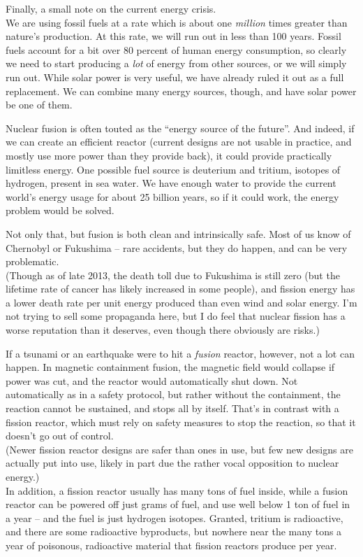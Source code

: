 Finally, a small note on the current energy crisis.\\
We are using fossil fuels at a rate which is about one \emph{million} times greater than nature's production. At this rate, we will run out in less than 100 years. Fossil fuels account for a bit over 80 percent of human energy consumption, so clearly we need to start producing a \emph{lot} of energy from other sources, or we will simply run out. While solar power is very useful, we have already ruled it out as a full replacement. We can combine many energy sources, though, and have solar power be one of them.

Nuclear fusion is often touted as the ``energy source of the future''. And indeed, if we can create an efficient reactor (current designs are not usable in practice, and mostly use more power than they provide back), it could provide practically limitless energy. One possible fuel source is deuterium and tritium, isotopes of hydrogen, present in sea water. We have enough water to provide the current world's energy usage for about 25 billion years, so if it could work, the energy problem would be solved.

Not only that, but fusion is both clean and intrinsically safe. Most of us know of Chernobyl or Fukushima -- rare accidents, but they do happen, and can be very problematic.\\
(Though as of late 2013, the death toll due to Fukushima is still zero (but the lifetime rate of cancer has likely increased in some people), and fission energy has a lower death rate per unit energy produced than even wind and solar energy. I'm not trying to sell some propaganda here, but I do feel that nuclear fission has a worse reputation than it deserves, even though there obviously are risks.)

If a tsunami or an earthquake were to hit a \emph{fusion} reactor, however, not a lot can happen. In magnetic containment fusion, the magnetic field would collapse if power was cut, and the reactor would automatically shut down. Not automatically as in a safety protocol, but rather without the containment, the reaction cannot be sustained, and stops all by itself. That's in contrast with a fission reactor, which must rely on safety measures to stop the reaction, so that it doesn't go out of control.\\
(Newer fission reactor designs are safer than ones in use, but few new designs are actually put into use, likely in part due the rather vocal opposition to nuclear energy.)\\
In addition, a fission reactor usually has many tons of fuel inside, while a fusion reactor can be powered off just grams of fuel, and use well below 1 ton of fuel in a year -- and the fuel is just hydrogen isotopes. Granted, tritium is radioactive, and there are some radioactive byproducts, but nowhere near the many tons a year of poisonous, radioactive material that fission reactors produce per year.
